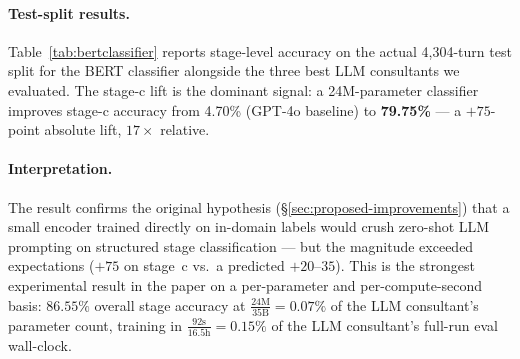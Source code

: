 \documentclass[11pt]{article}
\begin{document}
\paragraph{Test-split results.} Table~\ref{tab:bertclassifier} reports stage-level accuracy on the actual 4{,}304-turn test split for the BERT classifier alongside the three best LLM consultants we evaluated. The stage-c lift is the dominant signal: a 24M-parameter classifier improves stage-c accuracy from 4.70\% (GPT-4o baseline) to \textbf{79.75\%} --- a $+75$-point absolute lift, $17\times$ relative.

\begin{table}[t]
  \centering
  \small
  \caption{Stage classification on the 681-dialogue test split (4{,}304 turns). The 24M-parameter BERT classifier (\texttt{BAAI/bge-small-zh-v1.5}) trained for 92 seconds on the train split's 36{,}659 (history, stage) pairs outperforms every LLM consultant configuration we evaluated at this paper, at every stage. Per-stage residual confusion is concentrated between adjacent stages (c$\leftrightarrow$d most common, semantically inductive-reasoning vs.\ resolution).}
  \label{tab:bertclassifier}
\end{table}

\paragraph{Interpretation.} The result confirms the original hypothesis (\S\ref{sec:proposed-improvements}) that a small encoder trained directly on in-domain labels would crush zero-shot LLM prompting on structured stage classification --- but the magnitude exceeded expectations ($+75$ on stage~c vs.\ a predicted $+20$--$35$). This is the strongest experimental result in the paper on a per-parameter and per-compute-second basis: $86.55\%$ overall stage accuracy at $\frac{24\text{M}}{35\text{B}} = 0.07\%$ of the LLM consultant's parameter count, training in $\frac{92\text{s}}{16.5\text{h}} = 0.15\%$ of the LLM consultant's full-run eval wall-clock.
\end{document}
